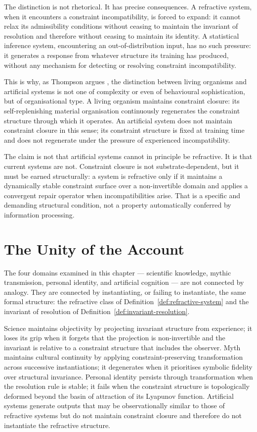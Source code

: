 \documentclass[11pt,openany]{book}
\begin{document}
The distinction is not rhetorical.  It has precise
consequences.  A refractive system, when it encounters a
constraint incompatibility, is forced to expand: it cannot
relax its admissibility conditions without ceasing to
maintain the invariant of resolution and therefore without
ceasing to maintain its identity.  A statistical inference
system, encountering an out-of-distribution input, has no
such pressure: it generates a response from whatever
structure its training has produced, without any mechanism
for detecting or resolving constraint incompatibility.

This is why, as Thompson argues \citep{thompson2023blindspot},
the distinction between living organisms and artificial
systems is not one of complexity or even of behavioural
sophistication, but of organisational type.  A living
organism maintains constraint closure: its self-replenishing
material organisation continuously regenerates the
constraint structure through which it operates.  An
artificial system does not maintain constraint closure in
this sense; its constraint structure is fixed at training
time and does not regenerate under the pressure of
experienced incompatibility.

The claim is not that artificial systems cannot in
principle be refractive.  It is that current systems are
not.  Constraint closure is not substrate-dependent, but it
must be earned structurally: a system is refractive only if
it maintains a dynamically stable constraint surface over a
non-invertible domain and applies a convergent repair
operator when incompatibilities arise.  That is a specific
and demanding structural condition, not a property
automatically conferred by information processing.

\section{The Unity of the Account}
\label{sec:unity}

The four domains examined in this chapter --- scientific
knowledge, mythic transmission, personal identity, and
artificial cognition --- are not connected by analogy.
They are connected by instantiating, or failing to
instantiate, the same formal structure: the refractive
class of Definition~\ref{def:refractive-system} and the
invariant of resolution of
Definition~\ref{def:invariant-resolution}.

Science maintains objectivity by projecting invariant
structure from experience; it loses its grip when it
forgets that the projection is non-invertible and the
invariant is relative to a constraint structure that
includes the observer.  Myth maintains cultural continuity
by applying constraint-preserving transformation across
successive instantiations; it degenerates when it
prioritises symbolic fidelity over structural invariance.
Personal identity persists through transformation when the
resolution rule is stable; it fails when the constraint
structure is topologically deformed beyond the basin of
attraction of its Lyapunov function.  Artificial systems
generate outputs that may be observationally similar to
those of refractive systems but do not maintain constraint
closure and therefore do not instantiate the refractive
structure.
\end{document}
